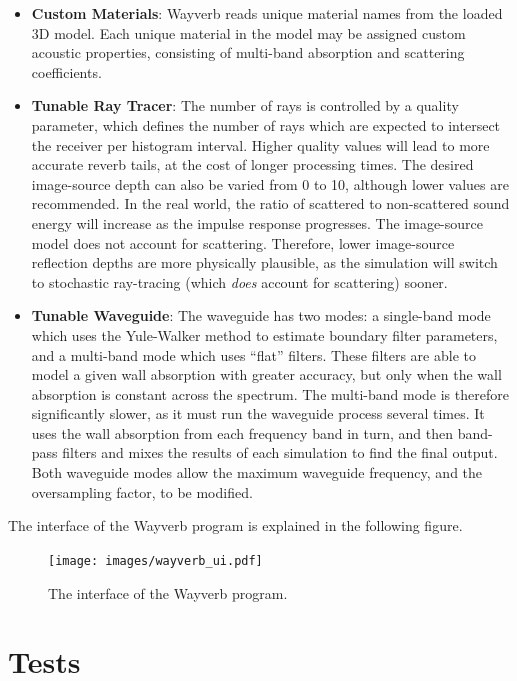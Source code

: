 \documentclass[]{scrreprt}
\begin{document}
\begin{itemize}
{  Modelling} section). This produces a realistic stereo time-delay
  effect in the early-reflection portion of the output, aiding
  localisation.
\item
  \textbf{Custom Materials}: Wayverb reads unique material names from
  the loaded 3D model. Each unique material in the model may be assigned
  custom acoustic properties, consisting of multi-band absorption and
  scattering coefficients.
\item
  \textbf{Tunable Ray Tracer}: The number of rays is controlled by a
  quality parameter, which defines the number of rays which are expected
  to intersect the receiver per histogram interval. Higher quality
  values will lead to more accurate reverb tails, at the cost of longer
  processing times. The desired image-source depth can also be varied
  from 0 to 10, although lower values are recommended. In the real
  world, the ratio of scattered to non-scattered sound energy will
  increase as the impulse response progresses. The image-source model
  does not account for scattering. Therefore, lower image-source
  reflection depths are more physically plausible, as the simulation
  will switch to stochastic ray-tracing (which \emph{does} account for
  scattering) sooner.
\item
  \textbf{Tunable Waveguide}: The waveguide has two modes: a single-band
  mode which uses the Yule-Walker method to estimate boundary filter
  parameters, and a multi-band mode which uses ``flat'' filters. These
  filters are able to model a given wall absorption with greater
  accuracy, but only when the wall absorption is constant across the
  spectrum. The multi-band mode is therefore significantly slower, as it
  must run the waveguide process several times. It uses the wall
  absorption from each frequency band in turn, and then band-pass
  filters and mixes the results of each simulation to find the final
  output. Both waveguide modes allow the maximum waveguide frequency,
  and the oversampling factor, to be modified.
\end{itemize}

The interface of the Wayverb program is explained in the following
figure\text{
(\ref{fig:wayverb_ui})}.

\begin{figure}[htbp]
\centering
\texttt{[image: images/wayverb\_ui.pdf]}
\caption{The interface of the Wayverb program.\label{fig:wayverb_ui}}
\end{figure}

\section{Tests}\label{tests}
\end{document}
